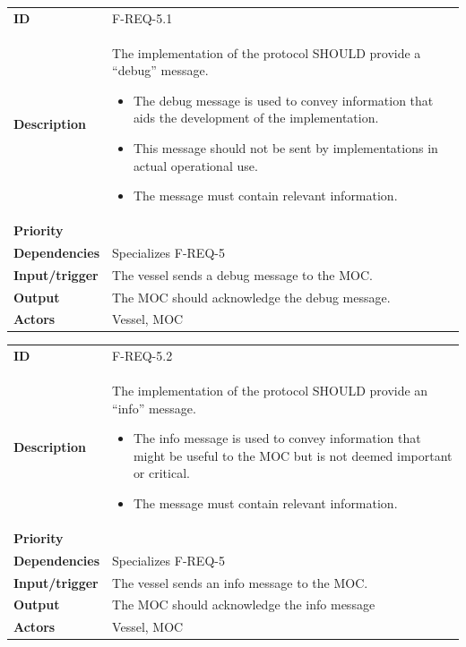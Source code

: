 \begin{table}[H]
	\centering
	\begin{tabularx}{\textwidth}{ l X }
		\rowcolor[HTML]{E7E7E7}
		\textbf{ID} & F-REQ-5.1 \\
		\textbf{Description} & The implementation of the protocol SHOULD provide a “debug” message.
		\begin{itemize}
			\item The debug message is used to convey information that aids the development of the implementation.
			\item This message should not be sent by implementations in actual operational use.
			\item The message must contain relevant information.
		\end{itemize} \\
		\rowcolor[HTML]{E7E7E7}
		\textbf{Priority} & \priohigh \\
		\textbf{Dependencies} & Specializes F-REQ-5 \\
		\rowcolor[HTML]{E7E7E7}
		\textbf{Input/trigger} & The vessel sends a debug message to the MOC. \\
		\textbf{Output} & The MOC should acknowledge the debug message. \\
		\rowcolor[HTML]{E7E7E7}
		\textbf{Actors} & Vessel, MOC \\
	\end{tabularx}
	\label{table:f-req-5.1}
\end{table}

\begin{table}[H]
	\centering
	\begin{tabularx}{\textwidth}{ l X }
		\rowcolor[HTML]{E7E7E7}
		\textbf{ID} & F-REQ-5.2 \\
		\textbf{Description} & The implementation of the protocol SHOULD provide an “info” message.
		\begin{itemize}
			\item The info message is used to convey information that might be useful to the MOC but is not deemed important or critical.
			\item The message must contain relevant information.
		\end{itemize} \\
		\rowcolor[HTML]{E7E7E7}
		\textbf{Priority} & \priohigh \\
		\textbf{Dependencies} & Specializes F-REQ-5 \\
		\rowcolor[HTML]{E7E7E7}
		\textbf{Input/trigger} & The vessel sends an info message to the MOC. \\
		\textbf{Output} & The MOC should acknowledge the info message \\
		\rowcolor[HTML]{E7E7E7}
		\textbf{Actors} & Vessel, MOC \\
	\end{tabularx}
	\label{table:f-req-5.2}
\end{table}

